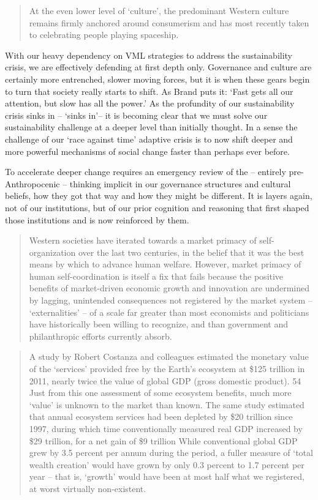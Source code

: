 \documentclass[
]{book}
\begin{document}
\begin{quote}
At the even lower level of `culture', the predominant Western culture remains firmly
anchored around consumerism and has most recently taken to celebrating people playing spaceship.
\end{quote}

With our heavy dependency on VML strategies to address
the sustainability crisis, we are effectively defending at first depth only. Governance and culture
are certainly more entrenched, slower moving forces, but it is when these gears begin to turn that
society really starts to shift. As Brand puts it:
`Fast gets all our attention, but slow has all the power.'
As the profundity of our sustainability crisis sinks in -- `sinks in'-- it is becoming clear that we must
solve our sustainability challenge at a deeper level than initially thought. In a sense the challenge of
our `race against time' adaptive crisis is to now shift deeper and more powerful mechanisms of social
change faster than perhaps ever before.

To accelerate deeper
change requires an emergency review of the -- entirely pre-Anthropocenic -- thinking implicit in our
governance structures and cultural beliefs, how they got that way and how they might be different. It
is layers again, not of our institutions, but of our prior cognition and reasoning that first shaped
those institutions and is now reinforced by them.

\begin{quote}
Western
societies have iterated towards a market primacy of self-organization over the last two centuries, in
the belief that it was the best means by which to advance human welfare. However, market primacy
of human self-coordination is itself a fix that fails because the positive benefits of market-driven
economic growth and innovation are undermined by lagging, unintended consequences not
registered by the market system -- `externalities' -- of a scale far greater than most economists and
politicians have historically been willing to recognize, and than government and philanthropic
efforts currently absorb.
\end{quote}

\begin{quote}
A study by Robert Costanza and
colleagues estimated the monetary value of the `services' provided free by the Earth's ecosystem at
\$125 trillion in 2011, nearly twice the value of global GDP (gross domestic product). 54 Just from this
one assessment of some ecosystem benefits, much more `value' is unknown to the market than
known.
The same study estimated that annual ecosystem services had been
depleted by \$20 trillion since 1997, during which time conventionally measured real GDP increased
by \$29 trillion, for a net gain of \$9 trillion
While conventional global GDP grew by 3.5 percent per
annum during the period, a fuller measure of `total wealth creation' would have grown by only 0.3
percent to 1.7 percent per year -- that is, `growth' would have been at most half what we registered, at
worst virtually non-existent.
\end{quote}
\end{document}
